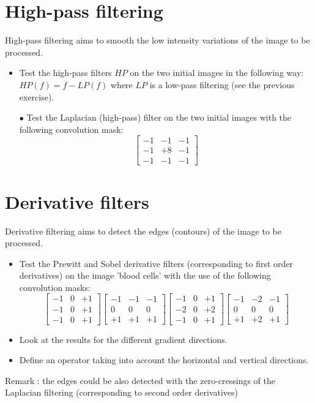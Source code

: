 \section{High-pass filtering}
High-pass filtering aims to smooth the low intensity variations of the image to be processed.
\begin{itemize}
	\item Test the high-pass filters $HP$ on the two initial images in the following way: 
	$HP(f)=f-LP(f)$ where $LP$ is a low-pass filtering (see the previous exercise).
	\item[$\bullet$] Test the Laplacian (high-pass) filter on the two initial images with the following convolution mask:
$$
\left[
\begin{array}{ccc}
-1&-1&-1\\
-1&+8&-1\\
-1&-1&-1
\end{array}
\right]
$$
\end{itemize}


\section{Derivative filters}
Derivative filtering aims to detect the edges (contours) of the image to be processed.
\begin{itemize}
	\item
Test the Prewitt and Sobel derivative filters (corresponding to first order derivatives) on the image 'blood cells' with the use of the following convolution masks:
$$
\left[
\begin{array}{ccc}
-1&0&+1\\
-1&0&+1\\
-1&0&+1
\end{array}
\right]
\left[
\begin{array}{rrr}
-1&-1&-1\\
0&0&0\\
+1&+1&+1
\end{array}
\right]
\left[
\begin{array}{ccc}
-1&0&+1\\
-2&0&+2\\
-1&0&+1
\end{array}
\right]
\left[
\begin{array}{rrr}
-1&-2&-1\\
0&0&0\\
+1&+2&+1
\end{array}
\right]
$$
\item Look at the results for the different gradient directions.
\item Define an operator taking into account the horizontal and vertical directions.
\end{itemize}
Remark : the edges could be also detected with the zero-cressings of the Laplacian filtering  (corresponding to second order derivatives)


